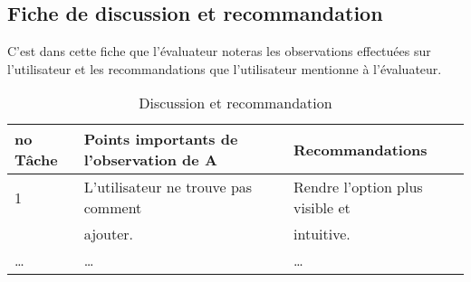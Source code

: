 \documentclass[letterpaper, oneside, 12pt,these,creativecommons]{thETS}
\begin{document}
\newpage

\subsection{Fiche de discussion et recommandation}

C'est dans cette fiche que l'évaluateur noteras les observations effectuées sur l'utilisateur et les recommandations que l'utilisateur mentionne à l'évaluateur.

\begin{table}[H]
\centering
\begin{tabular}{|l|l|l|}
	\hline
	no Tâche & Points importants de l’observation de A & Recommandations \\ \hline
	1 & L'utilisateur ne trouve pas comment & Rendre l'option plus visible et \\ 
	   & ajouter. & intuitive. \\ \hline
	\dots & \dots & \dots \\ \hline
\end{tabular}
\caption{Discussion et recommandation}
\end{table}
\end{document}
